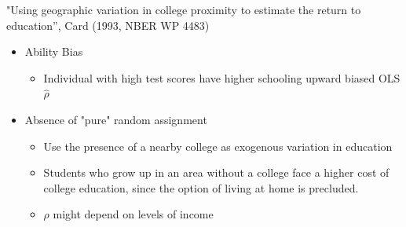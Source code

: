 \documentclass[pdftex]{beamer}
\begin{document}








 
 \begin{frame}
"Using geographic variation in college proximity to estimate the return to education'', Card (1993, NBER WP 4483)
 \begin{itemize}

\item Ability Bias
      \begin{itemize}
      \item Individual with high test scores have higher schooling upward biased OLS $\hat{\rho}$
      \end{itemize}

\item Absence of "pure" random assignment
     \begin{itemize}
      \item Use the presence of a nearby college as exogenous variation in education
      \item Students who grow up in an area without a college face a higher cost of college education, since the option of living at home is precluded.
      \end{itemize}
            \begin{itemize}
      \item  ${\rho}$ might depend on levels of income
      \end{itemize}
\end{itemize}
\end{frame}
\end{document}
